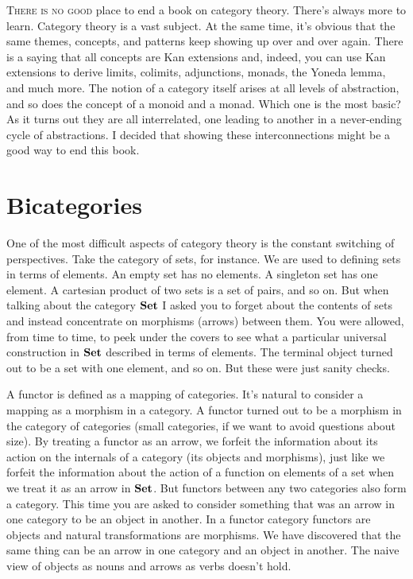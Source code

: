 \lettrine[lhang=0.17]{T}{here is no good} place to end a book on category theory. There's always
more to learn. Category theory is a vast subject. At the same time, it's
obvious that the same themes, concepts, and patterns keep showing up
over and over again. There is a saying that all concepts are Kan
extensions and, indeed, you can use Kan extensions to derive limits,
colimits, adjunctions, monads, the Yoneda lemma, and much more. The
notion of a category itself arises at all levels of abstraction, and so
does the concept of a monoid and a monad. Which one is the most basic?
As it turns out they are all interrelated, one leading to another in a
never-ending cycle of abstractions. I decided that showing these
interconnections might be a good way to end this book.

\section{Bicategories}\label{bicategories}

One of the most difficult aspects of category theory is the constant
switching of perspectives. Take the category of sets, for instance. We
are used to defining sets in terms of elements. An empty set has no
elements. A singleton set has one element. A cartesian product of two
sets is a set of pairs, and so on. But when talking about the category
$\mathbf{Set}$ I asked you to forget about the contents of sets and
instead concentrate on morphisms (arrows) between them. You were
allowed, from time to time, to peek under the covers to see what a
particular universal construction in $\mathbf{Set}$ described in terms of
elements. The terminal object turned out to be a set with one element,
and so on. But these were just sanity checks.

A functor is defined as a mapping of categories. It's natural to
consider a mapping as a morphism in a category. A functor turned out to
be a morphism in the category of categories (small categories, if we
want to avoid questions about size). By treating a functor as an arrow,
we forfeit the information about its action on the internals of a
category (its objects and morphisms), just like we forfeit the
information about the action of a function on elements of a set when we
treat it as an arrow in $\mathbf{Set}$. But functors between any two
categories also form a category. This time you are asked to consider
something that was an arrow in one category to be an object in another.
In a functor category functors are objects and natural transformations
are morphisms. We have discovered that the same thing can be an arrow in
one category and an object in another. The naive view of objects as
nouns and arrows as verbs doesn't hold.

